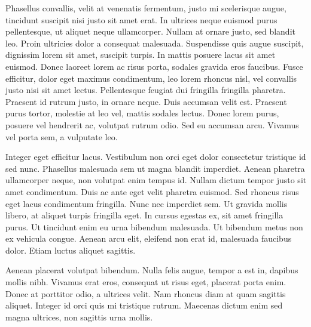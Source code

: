 \documentclass{resume}
\begin{document}
\begin{multicols}{2}
Phasellus convallis, velit at venenatis fermentum, justo mi scelerisque augue, tincidunt suscipit nisi justo sit amet erat. In ultrices neque euismod purus pellentesque, ut aliquet neque ullamcorper. Nullam at ornare justo, sed blandit leo. Proin ultricies dolor a consequat malesuada. Suspendisse quis augue suscipit, dignissim lorem sit amet, suscipit turpis. In mattis posuere lacus sit amet euismod. Donec laoreet lorem ac risus porta, sodales gravida eros faucibus. Fusce efficitur, dolor eget maximus condimentum, leo lorem rhoncus nisl, vel convallis justo nisi sit amet lectus. Pellentesque feugiat dui fringilla fringilla pharetra. Praesent id rutrum justo, in ornare neque. Duis accumsan velit est. Praesent purus tortor, molestie at leo vel, mattis sodales lectus. Donec lorem purus, posuere vel hendrerit ac, volutpat rutrum odio. Sed eu accumsan arcu. Vivamus vel porta sem, a vulputate leo.

Integer eget efficitur lacus. Vestibulum non orci eget dolor consectetur tristique id sed nunc. Phasellus malesuada sem ut magna blandit imperdiet. Aenean pharetra ullamcorper neque, non volutpat enim tempus id. Nullam dictum tempor justo sit amet condimentum. Duis ac ante eget velit pharetra euismod. Sed rhoncus risus eget lacus condimentum fringilla. Nunc nec imperdiet sem. Ut gravida mollis libero, at aliquet turpis fringilla eget. In cursus egestas ex, sit amet fringilla purus. Ut tincidunt enim eu urna bibendum malesuada. Ut bibendum metus non ex vehicula congue. Aenean arcu elit, eleifend non erat id, malesuada faucibus dolor. Etiam luctus aliquet sagittis.

Aenean placerat volutpat bibendum. Nulla felis augue, tempor a est in, dapibus mollis nibh. Vivamus erat eros, consequat ut risus eget, placerat porta enim. Donec at porttitor odio, a ultrices velit. Nam rhoncus diam at quam sagittis aliquet. Integer id orci quis mi tristique rutrum. Maecenas dictum enim sed magna ultrices, non sagittis urna mollis.

\end{multicols}
\end{document}
